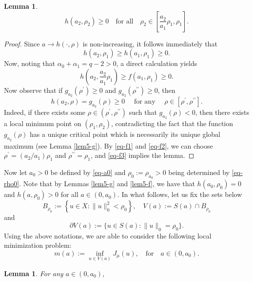\documentclass[11pt]{amsart}
\newtheorem{lemma}[theorem]{Lemma}
\numberwithin{equation}{section}
\begin{document}
{{\begin{lemma}
    $$
    h\left(a_2, \rho_2\right) \geq 0 \quad \text {for all} \quad \rho_2 \in\left[\frac{a_2}{a_1} \rho_1, \rho_1\right] .
    $$
    \end{lemma}
    \begin{proof}
    Since $a \rightarrow h(\cdot, \rho)$ is non-increasing,  it follows immediately that
    \begin{equation}\label{eq-f1}
    h\left(a_2, \rho_1\right) \geq h\left(a_1, \rho_1\right) \geq 0.
    \end{equation}
    Now, noting that $\alpha_0+\alpha_1=q-2>0$, a direct calculation yields
    \begin{equation}\label{eq-f2}
    h\left(a_2, \frac{a_2}{a_1} \rho_1\right) \geq f\left(a_1, \rho_1\right) \geq 0.
    \end{equation}
    Now observe that if $g_{a_2}\left(\rho^{\prime}\right) \geq 0$ and $g_{a_2}\left(\rho^{\prime \prime}\right) \geq 0$, then
    \begin{equation}\label{eq-f3}
    h\left(a_2, \rho\right)=g_{a_2}(\rho) \geq 0 \quad \text { for any } \quad \rho \in\left[\rho^{\prime}, \rho^{\prime \prime}\right].
    \end{equation}
    {Indeed,  if there exists some  $\rho \in\left(\rho^{\prime}, \rho^{\prime \prime}\right)$ such that $g_{a_2}(\rho)<0$,} then there exists a local minimum point on $\left(\rho_1, \rho_2\right)$,  contradicting the fact that the function $g_{a_2}(\rho)$ has a unique critical point which is necessarily its unique global maximum (see Lemma \ref{lem5-g}). By \eqref{eq-f1} and  \eqref{eq-f2}, we can choose $\rho^{\prime}=\left(a_2 / a_1\right) \rho_1$ and $\rho^{\prime \prime}=\rho_1$, and \eqref{eq-f3} implies the lemma.
    \end{proof}
    Now let $a_0>0$ be defined by \eqref{eq-a0} and $\rho_0:=\rho_{a_0}>0$ being determined by \eqref{eq-rho0}. Note that by {Lemmas \ref{lem5-g} and \ref{lem5-f}}, we have that $h\left(a_0, \rho_0\right)=0$ and {$h\left(a, \rho_0\right)>0$ for all $a \in\left(0,a_0\right)$}. {In what follows, let us fix the sets below
    $$
    B_{\rho_0}:=\left\{u \in X:\|u\|_0^2<\rho_0\right\},\quad V(a):=S(a) \cap B_{\rho_0}
    $$
    and
    $$
    \partial V(a):=\{u \in S(a):\| u\|_{0}=\rho_0\}.
    $$
    Using the above notations, we are able to consider the following local minimization problem:
    $$
    m(a):=\inf _{u \in V(a)} J_\mu(u), \quad \mbox{for} \quad a \in\left(0, a_0\right).
    $$}
\begin{lemma}\label{Lem5-m(a)}
    For any $a \in\left(0, a_0\right)$,

\end{lemma}}}
\end{document}
